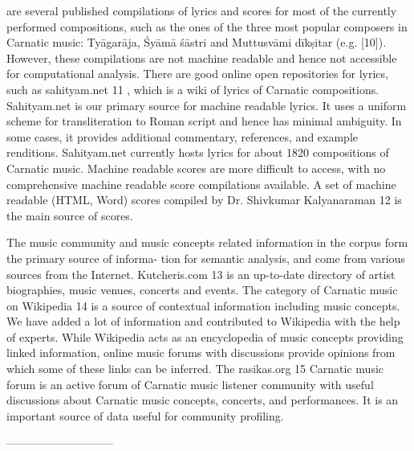 are several published compilations of lyrics and scores for
most of the currently performed compositions, such as the
ones of the three most popular composers in Carnatic music:
Tyāgarāja, Śyāmā śāstri and Muttusvāmi dīkṣitar (e.g.
[10]). However, these compilations are not machine readable
and hence not accessible for computational analysis.
There are good online open repositories for lyrics, such as
sahityam.net 11 , which is a wiki of lyrics of Carnatic compositions.
Sahityam.net is our primary source for machine
readable lyrics. It uses a uniform scheme for transliteration
to Roman script and hence has minimal ambiguity. In some
cases, it provides additional commentary, references, and
example renditions. Sahityam.net currently hosts lyrics for
about 1820 compositions of Carnatic music. Machine readable
scores are more difficult to access, with no comprehensive
machine readable score compilations available. A
set of machine readable (HTML, Word) scores compiled
by Dr. Shivkumar Kalyanaraman 12 is the main source of
scores.


The music community and music concepts related information
in the corpus form the primary source of informa-
tion for semantic analysis, and come from various sources
from the Internet. Kutcheris.com 13 is an up-to-date directory
of artist biographies, music venues, concerts and
events. The category of Carnatic music on Wikipedia 14
is a source of contextual information including music concepts.
We have added a lot of information and contributed
to Wikipedia with the help of experts. While Wikipedia
acts as an encyclopedia of music concepts providing linked
information, online music forums with discussions provide
opinions from which some of these links can be inferred.
The rasikas.org 15 Carnatic music forum is an active forum
of Carnatic music listener community with useful discussions
about Carnatic music concepts, concerts, and performances.
It is an important source of data useful for community
profiling.

-----------------------------


